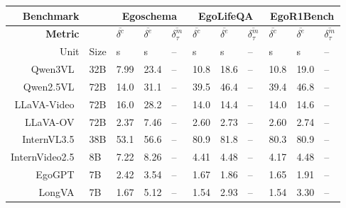 \begin{table}[htbp]
    \fontsize{7}{10}\selectfont
    \setlength{\tabcolsep}{6pt} %
    \renewcommand{\arraystretch}{1.4} %
    \centering
    \begin{tabular}{r|p{0.5cm}<{\centering}|p{0.3cm}<{\centering}p{0.3cm}<{\centering}p{0.5cm}<{\centering}|p{0.3cm}<{\centering}p{0.3cm}<{\centering}p{0.5cm}<{\centering}|p{0.3cm}<{\centering}p{0.3cm}<{\centering}p{0.5cm}<{\centering}}
        \textbf{Benchmark} & &
            \multicolumn{3}{c|}{\fontsize{10}{12}\selectfont Egoschema} &
            \multicolumn{3}{c|}{\fontsize{10}{12}\selectfont EgoLifeQA} &
            \multicolumn{3}{c}{\fontsize{10}{12}\selectfont EgoR1Bench}\\ \hline \hline
        \textbf{Metric} & 
        & $\overline{\delta^c}$ & $\overline{\delta^e}$ & $\overline{\delta^m_\tau}$
        & $\overline{\delta^c}$ & $\overline{\delta^e}$ & $\overline{\delta^m_\tau}$
        & $\overline{\delta^c}$ & $\overline{\delta^e}$ & $\overline{\delta^m_\tau}$ \\
        Unit & Size & s & s & -- & s & s & --  & s & s & -- \\    \hline
        Qwen3VL~\cite{yang2025Qwen3} & 32B  & 7.99  & 23.4  & --    & 10.8  & 18.6  & --    & 10.8  & 19.0  & -- \\
        Qwen2.5VL~\cite{qwen2025Qwen25} & 72B & 14.0  & 31.1  & --    & 39.5  & 46.4  & --    & 39.4  & 46.8  & -- \\
        LLaVA-Video~\cite{zhang2025LLaVAVideo} & 72B & 16.0  & 28.2  & --    & 14.0  & 14.4  & --    & 14.0  & 14.6  & -- \\
        LLaVA-OV~\cite{li2024LLaVAOneVision} & 72B & 2.37  & 7.46  & --    & 2.60  & 2.73  & --    & 2.60  & 2.74  & -- \\
        InternVL3.5~\cite{zhu2025InternVL3} & 38B  & 53.1  & 56.6  & --    & 80.9  & 81.8  & --    & 80.3  & 80.9  & -- \\
        InternVideo2.5~\cite{wang2025InternVideo25} & 8B  & 7.22  & 8.26  & --    & 4.41  & 4.48  & --    & 4.17  & 4.48  & -- \\
        EgoGPT~\cite{yang2025EgoLife} & 7B & 2.42  & 3.54  & --    & 1.67  & 1.86  & --    & 1.65  & 1.91  & -- \\
        LongVA~\cite{zhang2024LongVA} & 7B & 1.67  & 5.12  & --    & 1.54  & 2.93  & --    & 1.54  & 3.30  & -- \\

\end{tabular}
\end{table}

